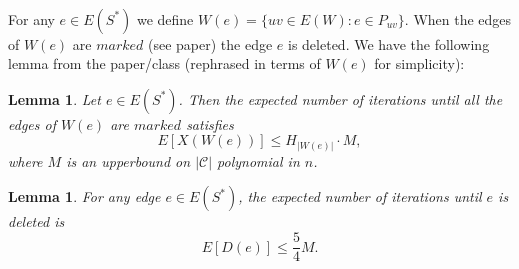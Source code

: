 \documentclass[letterpaper,12pt,oneside,onecolumn]{article}
\newcommand{\cC}{\mathcal{C}} \newcommand{\cD}{\mathcal{D}}
\newtheorem{lemma}[fact]{Lemma}
\begin{document}
\paragraph{}
For any $e \in E(S^*)$ we define $W(e) = \{ uv \in E(W): e \in P_{uv}\}$. When the edges of $W(e)$ are $\textit{marked}$ (see paper) the edge $e$ is deleted. We have the following lemma from the paper/class (rephrased in terms of $W(e)$ for simplicity):
\begin{lemma}\label{lemma:20}
Let $e \in E(S^*)$. Then the expected number of iterations until all the edges of $W(e)$ are $\textit{marked}$ satisfies $$E[X(W(e))] \leq H_{|W(e)|} \cdot M,$$
where $M$ is an upperbound on $|\cC|$ polynomial in $n$.
\end{lemma}
\begin{lemma}\label{lemma:de}
For any edge $e \in E(S^*)$, the expected number of iterations until $e$ is deleted is
$$E[D(e)] \leq \frac{5}{4} M.$$
\end{lemma}
\end{document}
